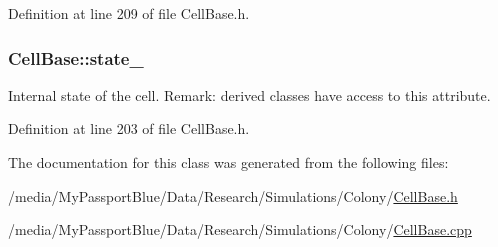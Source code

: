 \-Definition at line 209 of file \-Cell\-Base.\-h.

\hypertarget{class_cell_base_a966e4298cabc00986bb03ce92dfad1f5}{
\subsubsection[{state\-\_\-}]{ {\bf \-Cell\-Base\-::state\-\_\-}}}\label{class_cell_base_a966e4298cabc00986bb03ce92dfad1f5}
\-Internal state of the cell. \-Remark\-: derived classes have access to this attribute. 

\-Definition at line 203 of file \-Cell\-Base.\-h.



\-The documentation for this class was generated from the following files\-:\begin{DoxyCompactItemize}
\item 
/media/\-My\-Passport\-Blue/\-Data/\-Research/\-Simulations/\-Colony/\hyperlink{_cell_base_8h}{\-Cell\-Base.\-h}\item 
/media/\-My\-Passport\-Blue/\-Data/\-Research/\-Simulations/\-Colony/\hyperlink{_cell_base_8cpp}{\-Cell\-Base.\-cpp}\end{DoxyCompactItemize}

